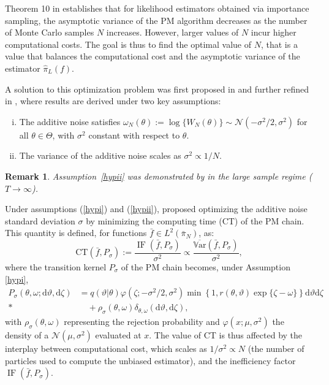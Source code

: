\documentclass[pdflatex,sn-mathphys-num]{sn-jnl}
\newcommand{\Var}{\mathbb{V}\text{ar}}
\newcommand{\Norm}{\mathcal{N}}
\theoremstyle{thmstyleone}
\theoremstyle{thmstyletwo}
\newtheorem{remark}{Remark}
\theoremstyle{thmstylethree}
\begin{document}
Theorem 10 in \cite{andrieu_establishing_2016} establishes that for likelihood estimators obtained via importance sampling, the asymptotic variance of the PM algorithm decreases as the number of Monte Carlo samples \(N\) increases. However, larger values of \(N\) incur higher computational costs. The goal is thus to find the optimal value of $N$, that is a value that balances the computational cost and the asymptotic variance of the estimator $\widehat{\pi}_L(f)$. 

A solution to this optimization problem was first proposed in \cite{pitt_properties_2012} and further refined in \cite{doucet_efficient_2015, sherlock_efficiency_2015, schmon_large-sample_2021}, where results are derived under two key assumptions:
\begin{enumerate}[(i)]
    \item The additive noise satisfies $\omega_N(\theta) := \log\{W_N(\theta)\} \sim \mathcal{N}(-\sigma^2/2, \sigma^2)$ for all $\theta \in \Theta$, with $\sigma^2$ constant with respect to $\theta$.
    \label{hypi}
    \item The variance of the additive noise scales as $\sigma^2 \propto 1/N$.
    \label{hypii}
\end{enumerate}
\begin{remark}
    Assumption~\eqref{hypii} was demonstrated by \cite{ deligiannidis_correlated_2018, berard_lognormal_2014} in the large sample regime ($T \to \infty$).
\end{remark}

Under assumptions (\ref{hypi}) and (\ref{hypii}), \cite{pitt_properties_2012} proposed optimizing the additive noise standard deviation \(\sigma\) by minimizing the computing time (CT) of the PM chain. This quantity is defined, for functions $\bar f \in L^2(\bar{\pi}_N)$, as:
\begin{equation}
    \text{CT}(\bar f,P_\sigma) :=  \frac{\operatorname{IF}(\bar f,P_\sigma)}{\sigma^2} \propto \frac{\overline{\Var}(\bar f,P_\sigma)}{\sigma^2},
    \label{CT}
\end{equation}
where the transition kernel $P_\sigma$ of the PM chain becomes, under Assumption \eqref{hypi},
\begin{align}
   {P_\sigma}\left(\theta,\omega ; \mathrm{d} \vartheta,\mathrm{d}\zeta\right)&= q(\vartheta|\theta) \varphi(\zeta ; -\sigma^2/2, \sigma^2) \min \left\{1, r(\theta, \vartheta) \exp\{\zeta-\omega\}\right\}  \mathrm{d}\vartheta \mathrm{d}\zeta \nonumber\\*
   &\quad +  {\rho_\sigma}(\theta,\omega) \delta_{\theta, \omega}(\mathrm{d} \vartheta ,\mathrm{d}\zeta),
   \label{limitkernel}
\end{align}
with \({\rho_\sigma}(\theta,\omega)\) representing the rejection probability and $\varphi(x; \mu, \sigma^2)$ the density of a $\Norm(\mu,\sigma^2)$ evaluated at $x$. The value of CT is thus affected by the interplay between computational cost, which scales as $1/\sigma^2 \propto N$ (the number of particles used to compute the unbiased estimator), and the inefficiency factor $\operatorname{IF}(\bar{f},P_\sigma)$.
\end{document}
